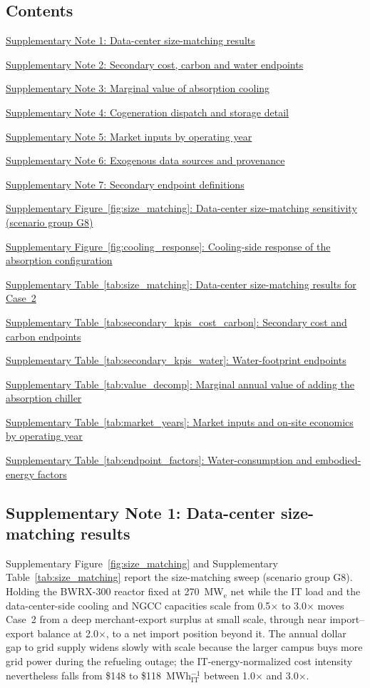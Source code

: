 \documentclass[a4paper,fleqn]{cas-sc}
\newcommand{\sitocline}[2]{\noindent\hyperref[#2]{#1}~\nobreak\dotfill~\pageref{#2}\par\addvspace{2pt}}
\begin{document}
\subsection*{Contents}
{\small
\sitocline{Supplementary Note 1: Data-center size-matching results}{note:size}
\sitocline{Supplementary Note 2: Secondary cost, carbon and water endpoints}{note:secondary}
\sitocline{Supplementary Note 3: Marginal value of absorption cooling}{note:absvalue}
\sitocline{Supplementary Note 4: Cogeneration dispatch and storage detail}{note:dispatch}
\sitocline{Supplementary Note 5: Market inputs by operating year}{note:market}
\sitocline{Supplementary Note 6: Exogenous data sources and provenance}{note:provenance}
\sitocline{Supplementary Note 7: Secondary endpoint definitions}{note:endpoints}
\medskip
\sitocline{Supplementary Figure~\ref*{fig:size_matching}: Data-center size-matching sensitivity (scenario group G8)}{fig:size_matching}
\sitocline{Supplementary Figure~\ref*{fig:cooling_response}: Cooling-side response of the absorption configuration}{fig:cooling_response}
\medskip
\sitocline{Supplementary Table~\ref*{tab:size_matching}: Data-center size-matching results for Case~2}{tab:size_matching}
\sitocline{Supplementary Table~\ref*{tab:secondary_kpis_cost_carbon}: Secondary cost and carbon endpoints}{tab:secondary_kpis_cost_carbon}
\sitocline{Supplementary Table~\ref*{tab:secondary_kpis_water}: Water-footprint endpoints}{tab:secondary_kpis_water}
\sitocline{Supplementary Table~\ref*{tab:value_decomp}: Marginal annual value of adding the absorption chiller}{tab:value_decomp}
\sitocline{Supplementary Table~\ref*{tab:market_years}: Market inputs and on-site economics by operating year}{tab:market_years}
\sitocline{Supplementary Table~\ref*{tab:endpoint_factors}: Water-consumption and embodied-energy factors}{tab:endpoint_factors}
}
\clearpage
\subsection*{Supplementary Note 1: Data-center size-matching results}\label{note:size}
Supplementary Figure~\ref{fig:size_matching} and Supplementary Table~\ref{tab:size_matching} report the size-matching sweep (scenario group G8). Holding the BWRX-300 reactor fixed at 270~MW$_\mathrm{e}$ net while the IT load and the data-center-side cooling and NGCC capacities scale from 0.5$\times$ to 3.0$\times$ moves Case~2 from a deep merchant-export surplus at small scale, through near import--export balance at 2.0$\times$, to a net import position beyond it. The annual dollar gap to grid supply widens slowly with scale because the larger campus buys more grid power during the refueling outage; the IT-energy-normalized cost intensity nevertheless falls from \$148 to \$118~MWh$_\mathrm{IT}^{-1}$ between 1.0$\times$ and 3.0$\times$.
\end{document}
